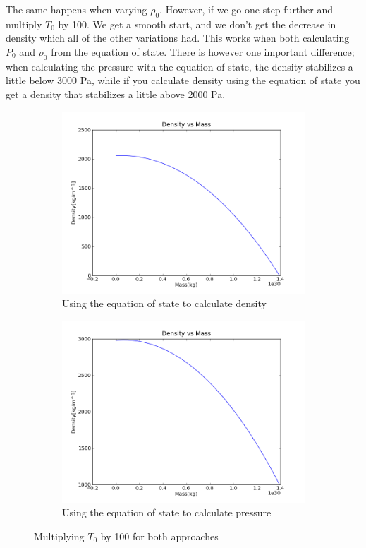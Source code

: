 \documentclass[a4paper,12pt]{article}
\begin{document}
The same happens when varying $\rho_0$. However, if we go one step further and multiply $T_0$ by 100. We get a smooth start, and we don't get the decrease in density which all of the other variations had. This works when both calculating $P_0$ and $\rho_0$ from the equation of state. There is however one important difference; when calculating the pressure with the equation of state, the density stabilizes a little below 3000 Pa, while if you calculate density using the equation of state you get a density that stabilizes a little above 2000 Pa.

\begin{figure}[H]
    \centering
    \begin{subfigure}{0.49\textwidth}
      \includegraphics[width=\textwidth]{Calculate_density/Density_for_rho_p_t_others_constant_Ttimes100}
      \caption{Using the equation of state to calculate density}
      \label{fig:density_density_Ttimes100}
    \end{subfigure}
    \begin{subfigure}{0.49\textwidth}
      \includegraphics[width=\textwidth]{Calculate_pressure/Density_for_rho_p_t_others_constant_Ttimes100}
      \caption{Using the equation of state to calculate pressure}
      \label{fig:density_pressure_Ttimes100}
    \end{subfigure}
    \caption{Multiplying $T_0$ by 100 for both approaches}
\end{figure}
\end{document}
